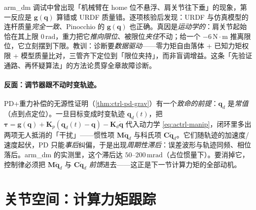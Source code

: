 \begin{note}[陷阱：把限位夹持误诊为重力补偿出错]
arm\_dm 调试中曾出现「机械臂在 home 位不悬浮、肩关节往下垂」的现象，第一反应是 $\mathbf{g}(\mathbf{q})$ 算错或 URDF 质量错。逐项核验后发现：URDF 与仿真模型的连杆质量\emph{完全一致}、Pinocchio 的 $\mathbf{g}(\mathbf{q})$ 也正确。真因是\emph{运动学的}：肩关节起始恰在其上限 $0\,\mathrm{rad}$，重力把它\emph{推向限位}、被限位\emph{夹住}不动；给一个 $-6\,\mathrm{N\!\cdot\!m}$ 推离限位，它立刻摆到下限。教训：诊断要\emph{数据驱动}——零力矩自由落体 + 已知力矩权限 + 模型质量比对，三管齐下定位到「限位夹持」，而非盲调增益。这条「先验证通路、再怀疑算法」的方法论贯穿全章故障诊断。
\end{note}

\paragraph{反面：调节器跟不动时变轨迹。}
PD+重力补偿的无源性证明（\cref{thm:ctrl-pd-grav}）有一个\emph{致命的前提}：$\mathbf{q}_d$ 是\emph{常值}（点到点定位）。一旦目标变成时变轨迹 $\mathbf{q}_d(t)$，把 $\boldsymbol{\tau}=\mathbf{g}(\mathbf{q})+\mathbf{K}_p(\mathbf{q}_d(t)-\mathbf{q})-\mathbf{K}_d\dot{\mathbf{q}}$ 代入动力学 \cref{eq:actrl-manip}，闭环里多出两项无人抵消的「干扰」——惯性项 $\mathbf{M}\ddot{\mathbf{q}}_d$ 与科氏项 $\mathbf{C}\dot{\mathbf{q}}_d$。它们随轨迹的加速度/速度起伏，PD 只能\emph{事后}纠偏，于是出现\emph{周期性滞后}：误差波形与轨迹同频、相位落后。arm\_dm 的实测里，这个滞后达 $50$--$200\,\mathrm{mrad}$（占位惯量下）。要消掉它，控制律必须把 $\mathbf{M}\ddot{\mathbf{q}}_d$ 与 $\mathbf{C}\dot{\mathbf{q}}_d$ \emph{前馈}进去——这正是下一节计算力矩的全部动机。

\section{关节空间：计算力矩跟踪}
\label{sec:actrl-ctc}

